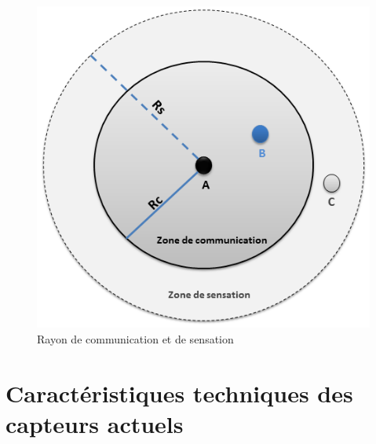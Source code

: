 \begin{figure}[h]
\centering
\includegraphics[scale=0.5]{Intro/percept}
\caption{\label{percept} Rayon de communication et de sensation}
\end{figure}




\section{Caractéristiques techniques des capteurs actuels}

